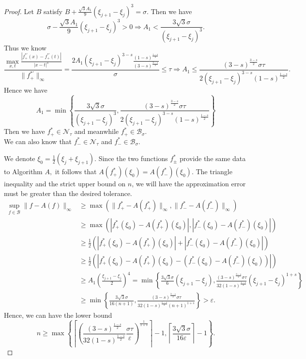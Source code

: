 \begin{proof}
Let $B$ satisfy $ B+\frac{\sqrt{3}A_{1}}{9}(\xi_{j+1}-\xi_{j})^{3}=\sigma.$
Then we have $$\sigma-\frac{\sqrt{3}A_{1}}{9}(\xi_{j+1}-\xi_{j})^{3} >0 \Rightarrow A_{1} < \frac{3\sqrt{3}\sigma}{(\xi_{j+1}-\xi_{j})^{3}}.$$
Thus we know
$$\frac{\max_{x,t}\frac{|f_{+}^{*'}(x)-f_{+}^{*'}(t)|}{|x-t|^{s}}}{ \|f_{+}^{*'} \|_{\infty}}=\frac{2A_{1}(\xi_{j+1}-\xi_{j})^{3-s}\frac{(1-s)^{\frac{1-s}{2}}}{(3-s)^{\frac{3-s}{2}}} }{\sigma}
 \leq \tau \Rightarrow A_{1} \leq\frac{(3-s)^{\frac{3-s}{2}}\sigma\tau}{2(\xi_{j+1}-\xi_{j})^{3-s}(1-s)^{\frac{1-s}{2}}} .$$
Hence we have $$A_{1}=\min\left\{\frac{3\sqrt{3}\sigma}{(\xi_{j+1}-\xi_{j})^{3}},\frac{(3-s)^{\frac{3-s}{2}}\sigma\tau}{2(\xi_{j+1}-\xi_{j})^{3-s}(1-s)^{\frac{1-s}{2}}} \right\}$$
Then we have $f_{+}^{*} \in \mathcal{N}_{\tau}$ and meanwhile $f_{+}^{*} \in \mathcal{B}_{\sigma}.$\\
We can also know that $f_{-}^{*} \in \mathcal{N}_{\tau}$ and $f_{-}^{*} \in \mathcal{B}_{\sigma}.$

We denote $\xi_{0}=\frac{1}{2}(\xi_{j}+\xi_{j+1}).$
Since the two functions $f_{\pm}^{*}$ provide the same data to Algorithm $A,$ it follows
that $A(f_{+}^{*})(\xi_{0})=A(f_{-}^{*})(\xi_{0}).$
The triangle inequality and the strict upper bound on
$n$, we will have the approximation error must be greater than the desired tolerance.
\begin{align*}
\sup\limits_{f \in \mathcal{B}}\|f-A(f)\|_{\infty} & \ge \max\left(\|f_{+}^{*}-A(f_{+}^{*})\|_{\infty},\|f_{-}^{*}-A(f_{-}^{*})\|_{\infty}\right) \\
& \ge \max\left(|f_{+}^{*}(\xi_{0})-A(f_{+}^{*})(\xi_{0})|,|f_{-}^{*}(\xi_{0})-A(f_{-}^{*})(\xi_{0})|\right) \\
& \ge \frac{1}{2}\left(|f_{+}^{*}(\xi_{0})-A(f_{+}^{*})(\xi_{0})|+|f_{-}^{*}(\xi_{0})-A(f_{-}^{*})(\xi_{0})|\right)\\
& \ge \frac{1}{2}\left(|f_{+}^{*}(\xi_{0})-A(f_{+}^{*})(\xi_{0})-\left(f_{-}^{*}(\xi_{0})-A(f_{-}^{*})(\xi_{0})\right)|\right)\\
& \ge A_{1}\left(\frac{\xi_{j+1}-\xi_{j}}{2}\right)^{4}=\min\left\{\frac{3\sqrt{3}\sigma}{    6}(\xi_{j+1}-\xi_{j}),\frac{(3-s)^{\frac{3-s}{2}}\sigma\tau}{32(1-s)^{\frac{1-s}{2}}}(\xi_{j+1}-\xi_{j})^{1+s} \right\} \\& \ge \min\left\{\frac{3\sqrt{3}\sigma}{16(n+1)},\frac{(3-s)^{\frac{3-s}{2}}\sigma\tau}{32(1-s)^{\frac{1-s}{2}}(n+1)^{1+s} } \right\}  > \varepsilon.
\end{align*}
  Hence, we can have the lower bound$$n \ge \max\left\{\left\lceil \left(\frac{(3-s)^{\frac{1-s}{2}}}{32(1-s)^{\frac{1-s}{2}}}\frac{\sigma\tau}{\varepsilon}\right)^{\frac{1}{1+s}} \right\rceil-1, \left\lceil \frac{3\sqrt{3}\sigma}{16\varepsilon}\right\rceil-1 \right\}.$$
\end{proof}
